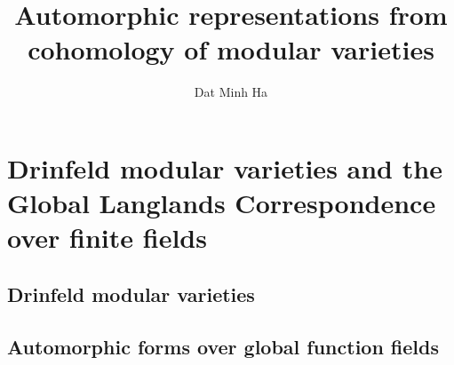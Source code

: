 

\setcounter{section}{-1}





	\title{Automorphic representations from cohomology of modular varieties}
	
	\author{Dat Minh Ha}
	\maketitle
	
	\begin{abstract}
	    
	\end{abstract}
	
	{
      \hypersetup{} 
      \dominitoc
      \tableofcontents %
    }
    
    \part{Drinfeld modular varieties and the Global Langlands Correspondence over finite fields}
        \chapter{Drinfeld modular varieties}
            \begin{abstract}
                
            \end{abstract}
            
            \minitoc
            
            
            
            
            
            
            
            
            
        \chapter{Automorphic forms over global function fields}
        
